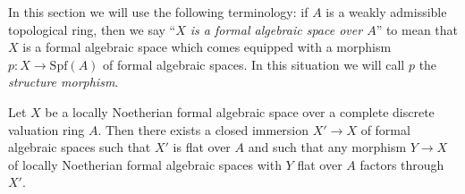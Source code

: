 \noindent
In this section we will use the following terminology:
if $A$ is a weakly admissible topological ring, then we
say ``{\it $X$ is a formal algebraic space over $A$}'' to mean that $X$
is a formal algebraic space which comes equipped with
a morphism $p : X \to \text{Spf}(A)$ of formal algebraic spaces.
In this situation we will call $p$ the {\it structure morphism}.

\begin{lemma}
\label{lemma-flat-locus}
Let $X$ be a locally Noetherian formal algebraic space over
a complete discrete valuation ring $A$.
Then there exists a closed immersion $X' \to X$
of formal algebraic spaces such that $X'$ is flat over $A$
and such that any morphism $Y \to X$ of locally Noetherian formal algebraic
spaces with $Y$ flat over $A$ factors through $X'$.
\end{lemma}

